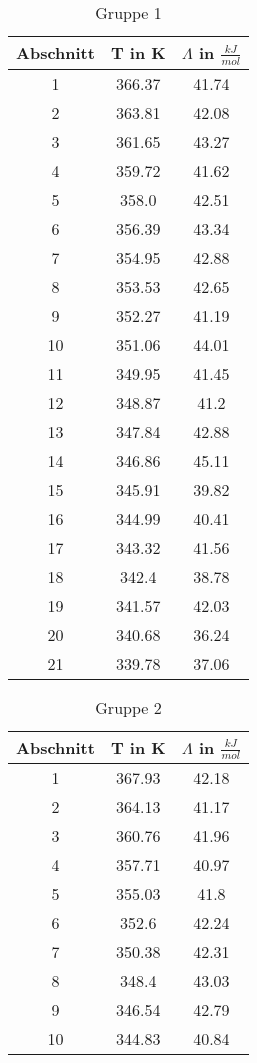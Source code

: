 \documentclass{article}
\begin{document}
\begin{table}[H]\centering
\caption{Gruppe 1}
\begin{tabular}{c|c|c}
Abschnitt&T in K&$\Lambda$ in $\frac{kJ}{mol}$\\
\hline
1&366.37&41.74\\
2&363.81&42.08\\
3&361.65&43.27\\
4&359.72&41.62\\
5&358.0&42.51\\
6&356.39&43.34\\
7&354.95&42.88\\
8&353.53&42.65\\
9&352.27&41.19\\
10&351.06&44.01\\
11&349.95&41.45\\
12&348.87&41.2\\
13&347.84&42.88\\
14&346.86&45.11\\
15&345.91&39.82\\
16&344.99&40.41\\
17&343.32&41.56\\
18&342.4&38.78\\
19&341.57&42.03\\
20&340.68&36.24\\
21&339.78&37.06\\
\end{tabular}
\end{table}

\begin{table}[H]\centering
\caption{Gruppe 2}
\begin{tabular}{c|c|c}
Abschnitt&T in K&$\Lambda$ in $\frac{kJ}{mol}$\\
\hline
1&367.93&42.18\\
2&364.13&41.17\\
3&360.76&41.96\\
4&357.71&40.97\\
5&355.03&41.8\\
6&352.6&42.24\\
7&350.38&42.31\\
8&348.4&43.03\\
9&346.54&42.79\\
10&344.83&40.84\\
\end{tabular}
\end{table}
\end{document}
